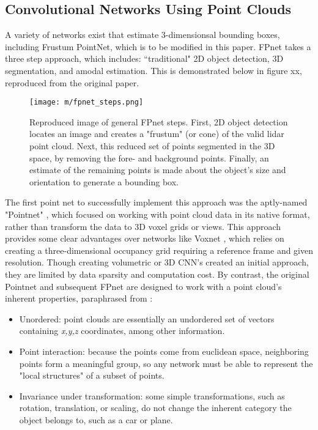 \subsection{Convolutional Networks Using Point Clouds}
A variety of networks exist that estimate 3-dimensionsal bounding boxes, including Frustum PointNet, which is to be modified in this paper. FPnet takes a three step approach, which includes: ``traditional" 2D object detection, 3D segmentation, and amodal estimation. This is demonstrated below in figure xx, reproduced from the original paper.
\begin{figure}[h] %
    \texttt{[image: m/fpnet\_steps.png]}
    \caption{Reproduced image of general FPnet steps. First, 2D object detection locates an image and creates a "frustum" (or cone) of the valid lidar point cloud. Next, this reduced set of points segmented in the 3D space, by removing the fore- and background points. Finally, an estimate of the remaining points is made about the object's size and orientation to generate a bounding box.}
\end{figure}


The first point net to successfully implement this approach was the aptly-named "Pointnet" \cite{qi2017pointnet}, which focused on working with point cloud data in its native format, rather than transform the data to 3D voxel grids or views. This approach provides some clear advantages over networks like Voxnet \cite{maturana2015voxnet}, which relies on creating a three-dimensional occupancy grid requiring a reference frame and given resolution. Though creating volumetric or 3D CNN's created an initial approach, they are limited by data sparsity and computation cost. By contrast, the original Pointnet and subsequent FPnet are designed to work with a point cloud's inherent properties, paraphrased from \cite{qi2017pointnet}: 
\begin{itemize} \itemsep=-0.5em
    \item Unordered: point clouds are essentially an undordered set of vectors containing \textit{x,y,z} coordinates, among other information.
    \item Point interaction: because the points come from euclidean space, neighboring points form a meaningful group, so any network must be able to represent the "local structures" of a subset of points.
    \item Invariance under transformation: some simple transformations, such as rotation, translation, or scaling, do not change the inherent category the object belongs to, such as a car or plane.
\end{itemize}

